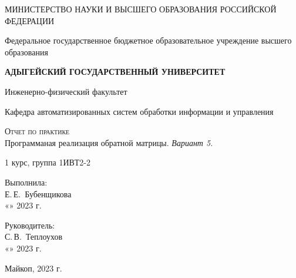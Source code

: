 \documentclass[12pt,a4paper]{scrartcl}
\begin{document}
 \begin{titlepage}
  \begin{center}
   \large
   МИНИСТЕРСТВО НАУКИ И ВЫСШЕГО ОБРАЗОВАНИЯ РОССИЙСКОЙ ФЕДЕРАЦИИ
   
   Федеральное государственное бюджетное образовательное учреждение высшего образования
   
   \textbf{АДЫГЕЙСКИЙ ГОСУДАРСТВЕННЫЙ УНИВЕРСИТЕТ}
   \vspace{0.25cm}
   
   Инженерно-физический факультет
   
   Кафедра автоматизированных систем обработки информации и управления
   \vfill

   \vfill
   
   \textsc{Отчет по практике}\\[5mm]
   
   {\LARGE Программаная реализация обратной матрицы. \textit{Вариант 5.}}
   \bigskip
   
   1 курс, группа 1ИВТ2-2
  \end{center}
  \vfill
  
  \newlength{\ML}
  \hfill\begin{minipage}{0.5\textwidth}
   Выполнила:\\
   \underline{\hspace{\ML}} Е.\,Е.~Бубенщикова\\
   «\underline{\hspace{0.7cm}}» \underline{\hspace{2cm}} 2023 г.
  \end{minipage}%
  \bigskip
  
  \hfill\begin{minipage}{0.5\textwidth}
   Руководитель:\\
   \underline{\hspace{\ML}} С.\,В.~Теплоухов\\
   «\underline{\hspace{0.7cm}}» \underline{\hspace{2cm}} 2023 г.
  \end{minipage}%
  \vfill
  
  \begin{center}
   Майкоп, 2023 г.
  \end{center}
 \end{titlepage}
 
\end{document}
